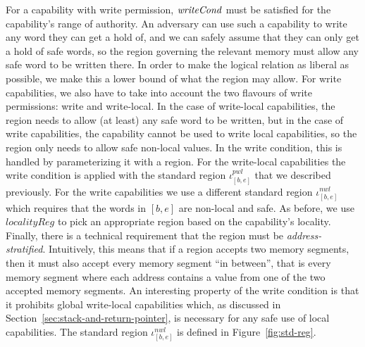 \documentclass[format=acmsmall, review=true, screen=true]{acmart}
\renewcommand{\figurename}{Figure}
\renewcommand{\sectionname}{Section}
\newcommand{\var}[1]{\mathit{#1}}
\newcommand{\start}{\var{b}}
\newcommand{\addrend}{\var{e}}
\newcommand{\nwl}{\var{nwl}}
\newcommand{\pwl}{\var{pwl}}
\newcommand{\plainfun}[2]{
  \ifthenelse{\equal{#2}{}}
  {\mathit{#1}}
  {\mathit{#1}(#2)}
}
\newcommand{\writeCond}[1]{\plainfun{writeCond}{#1}}
\begin{document}
For a capability with write permission, $\writeCond{}$ must be satisfied for the
capability's range of authority. An adversary can use such a capability to write
any word they can get a hold of, and we can safely assume that they can only get
a hold of safe words, so the region governing the relevant memory must allow any
safe word to be written there. In order to make the logical relation as liberal
as possible, we make this a lower bound of what the region may allow. 
For write capabilities, we also have to take into account
the two flavours of write permissions: write and write-local. In the case of
write-local capabilities, the region needs to allow (at least) any safe word to
be written, but in the case of write capabilities, the capability cannot be used
to write local capabilities, so the region only needs to allow safe non-local
values. In the write condition, this is handled by parameterizing it with a
region. For the write-local capabilities the write condition is applied with the
standard region $\iota^\pwl_{[\start,\addrend]}$ that we described previously. For
the write capabilities we use a different standard region
$\iota^\nwl_{[\start,\addrend]}$ which requires that the words in
$[\start,\addrend]$ are non-local and safe. As before, we use
$\var{localityReg}$ to pick an appropriate region based on the capability's
locality. Finally, there is a technical requirement that the region must be
\emph{address-stratified}. Intuitively, this means that if a region accepts two
memory segments, then it must also accept every memory segment ``in between'',
that is every memory segment where each address contains a value from one of the
two accepted memory segments. An interesting property of the write condition is
that it prohibits global write-local capabilities which, as discussed in
\sectionname~\ref{sec:stack-and-return-pointer}, is necessary for any safe use of
local capabilities.
The standard region $\iota^\nwl_{[\start,\addrend]}$ is defined in \figurename~\ref{fig:std-reg}.
\end{document}

